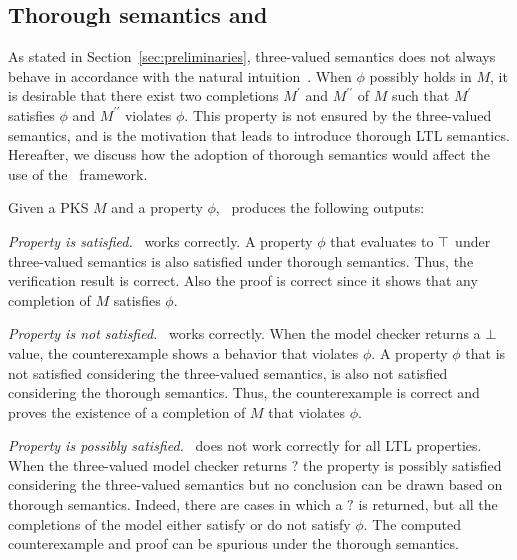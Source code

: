 \subsection{Thorough semantics and \NAME}
As stated in Section~\ref{sec:preliminaries},  three-valued semantics does not always behave in accordance with the natural intuition~\cite{bruns2000model}.
When $\phi$ possibly holds in $M$,   it is desirable that there exist two completions $M^\prime$ and $M^{\prime\prime}$ of $M$  such that $M^\prime$ satisfies  $\phi$  and   $M^{\prime\prime}$ violates $\phi$.
This property is not ensured by the three-valued semantics, and is the motivation that leads to introduce thorough LTL semantics. Hereafter, we discuss how the adoption of thorough semantics would affect the use of the \NAME\ framework.

Given a PKS  $M$ and a property  $\phi$,  \NAME\ produces the following outputs:

\noindent \emph{Property is satisfied.}
\NAME\ works correctly. 
A property $\phi$ that evaluates to $\operatorname{\top}$ under three-valued semantics is also satisfied under thorough semantics.
Thus, the  verification result is correct.
Also the proof is correct since it shows that any completion of $M$ satisfies $\phi$. 

\noindent \emph{Property is not satisfied.}
 \NAME\ works correctly. 
When the model checker returns a $\operatorname{\bot}$ value, the counterexample shows a behavior that violates $\phi$.
A property $\phi$  that is not satisfied considering the three-valued semantics, is also not satisfied considering the thorough semantics.
Thus, the counterexample is correct and proves the existence of a completion of $M$ that violates $\phi$.
 
\noindent \emph{Property is possibly satisfied.}
 \NAME\ does not work correctly  for all LTL properties. 
When the three-valued model checker returns  $?$  the property is possibly satisfied considering the three-valued semantics but no conclusion can be drawn based on thorough semantics.
Indeed, there are cases in which a $?$ is returned, but all the completions of the model either satisfy or do not satisfy $\phi$. 
The computed counterexample and proof can be spurious under the thorough semantics.



